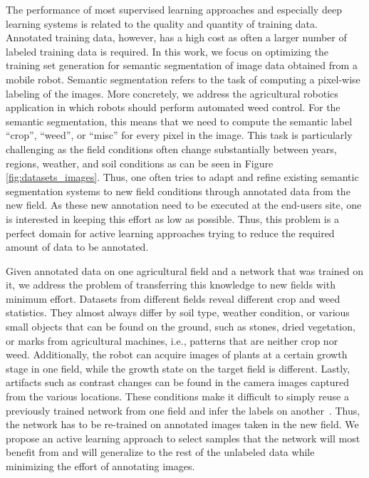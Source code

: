 \documentclass[letterpaper, 10 pt, conference]{ieeeconf}  %
\begin{document}
The performance of most supervised learning approaches and especially deep
learning  systems is related to the quality and quantity of training data.
Annotated training data, however, has a high cost as often a larger number of
labeled training data is  required.  In this work, we focus on optimizing the
training set generation for  semantic segmentation of image data obtained
from a mobile robot. Semantic segmentation refers to the task of computing a
pixel-wise  labeling of the images. More concretely, we address the
agricultural robotics  application in which robots should perform automated
weed control. For the semantic  segmentation, this means that we need to
compute the semantic label ``crop'', ``weed'',  or ``misc'' for every pixel in
the image. This task is particularly challenging  as the field conditions
often change substantially between years, regions, weather, and  soil
conditions as can be seen in Figure \ref{fig:datasets_images}.  Thus, one often tries to adapt and refine existing semantic
segmentation systems to new field conditions through annotated data from the
new field. As these new annotation need to be executed at the end-users site,
one is interested in keeping this effort as low as possible. Thus, this
problem is a perfect domain for active  learning approaches trying to reduce
the required amount of data to be annotated.

Given annotated data on one agricultural field and a network that was trained
on it, we address the problem of transferring this knowledge to new fields with
minimum effort.  Datasets from different fields reveal different crop and weed
statistics. They almost  always differ by soil type, weather condition, or
various small objects that can be found  on the ground, such as stones, dried
vegetation, or marks from agricultural machines,  i.e., patterns that are
neither crop nor weed. Additionally, the robot can acquire  images of plants
at a certain growth stage in one field, while the growth state on the  target
field is different. Lastly, artifacts such as contrast changes can be found in
the camera images captured from the various locations.  These conditions make
it difficult to simply reuse a previously trained network from one  field and
infer the labels on another~\cite{lottes2018ral,lottes2017iros}. Thus, 
the network has to be
re-trained on  annotated images taken in the new field. We propose an
active learning  approach to select samples that the network will most benefit
from and will generalize  to the rest of the unlabeled data while minimizing
the effort of annotating images.
\end{document}
